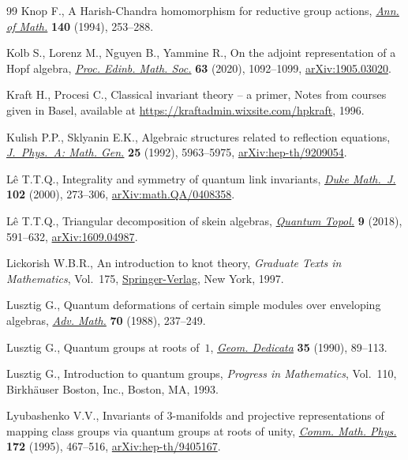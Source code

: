 \documentclass[pdftex]{sigma}%
\numberwithin{equation}{section}
\numberwithin{figure}{section}
\begin{document}
\begin{thebibliography}{99}
Knop F., A {H}arish-{C}handra homomorphism for reductive group actions,
 \href{https://doi.org/10.2307/2118600}{\textit{Ann. of Math.}} \textbf{140} (1994), 253--288.

Kolb S., Lorenz M., Nguyen B., Yammine R., On the adjoint representation of a
 {H}opf algebra, \href{https://doi.org/10.1017/S0013091520000358}{\textit{Proc. Edinb. Math. Soc.}} \textbf{63} (2020),
 1092--1099, \href{https://arxiv.org/abs/1905.03020}{arXiv:1905.03020}.

Kraft H., Procesi C., Classical invariant theory -- a primer, {N}otes from
 courses given in Basel, available at
 \url{https://kraftadmin.wixsite.com/hpkraft}, 1996.

Kulish P.P., Sklyanin E.K., Algebraic structures related to reflection
 equations, \href{https://doi.org/10.1088/0305-4470/25/22/022}{\textit{J.~Phys.~A: Math. Gen.}} \textbf{25} (1992), 5963--5975,
 \href{https://arxiv.org/abs/hep-th/9209054}{arXiv:hep-th/9209054}.

L\^e T.T.Q., Integrality and symmetry of quantum link invariants, \href{https://doi.org/10.1215/S0012-7094-00-10224-4}{\textit{Duke
 Math.~J.}} \textbf{102} (2000), 273--306, \href{https://arxiv.org/abs/math.QA/0408358}{arXiv:math.QA/0408358}.

L\^e T.T.Q., Triangular decomposition of skein algebras, \href{https://doi.org/10.4171/QT/115}{\textit{Quantum
 Topol.}} \textbf{9} (2018), 591--632, \href{https://arxiv.org/abs/1609.04987}{arXiv:1609.04987}.

Lickorish W.B.R., An introduction to knot theory, \textit{Graduate Texts in
 Mathematics}, Vol.~175, \href{https://doi.org/10.1007/978-1-4612-0691-0}{Springer-Verlag}, New York, 1997.

Lusztig G., Quantum deformations of certain simple modules over enveloping
 algebras, \href{https://doi.org/10.1016/0001-8708(88)90056-4}{\textit{Adv. Math.}} \textbf{70} (1988), 237--249.

Lusztig G., Quantum groups at roots of~{$1$}, \href{https://doi.org/10.1007/BF00147341}{\textit{Geom. Dedicata}}
 \textbf{35} (1990), 89--113.

Lusztig G., Introduction to quantum groups, \textit{Progress in Mathematics},
 Vol.~110, Birkh\"auser Boston, Inc., Boston, MA, 1993.

Lyubashenko V.V., Invariants of {$3$}-manifolds and projective representations
 of mapping class groups via quantum groups at roots of unity, \href{https://doi.org/10.1007/BF02101805}{\textit{Comm.
 Math. Phys.}} \textbf{172} (1995), 467--516, \href{https://arxiv.org/abs/hep-th/9405167}{arXiv:hep-th/9405167}.


\end{thebibliography}
\end{document}
